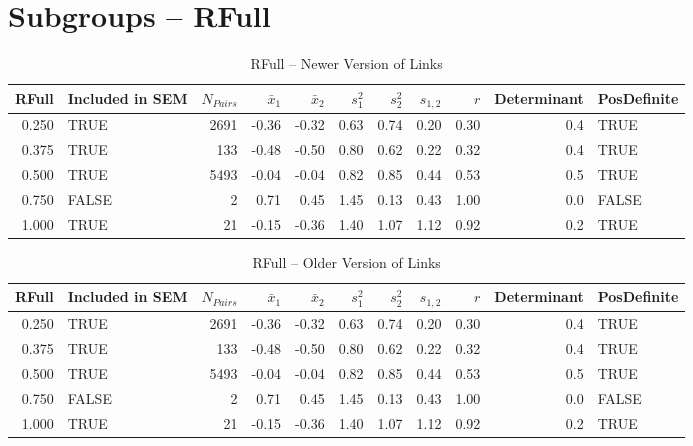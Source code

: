 \documentclass{article}\usepackage[]{graphicx}\usepackage[]{color}
\begin{document}
\section{Subgroups --  RFull }%
\begin{table}[ht]
\centering
\begin{tabular}{rlrrrrrrrrl}
  \hline
RFull & Included in SEM & $N_{Pairs}$ & $\bar{x}_1$ & $\bar{x}_2$ & $s_1^2$ & $s_2^2$ & $s_{1,2}$ & $r$ & Determinant & PosDefinite \\ 
  \hline
0.250 & TRUE & 2691 & -0.36 & -0.32 & 0.63 & 0.74 & 0.20 & 0.30 & 0.4 & TRUE \\ 
  0.375 & TRUE & 133 & -0.48 & -0.50 & 0.80 & 0.62 & 0.22 & 0.32 & 0.4 & TRUE \\ 
  0.500 & TRUE & 5493 & -0.04 & -0.04 & 0.82 & 0.85 & 0.44 & 0.53 & 0.5 & TRUE \\ 
  0.750 & FALSE & 2 & 0.71 & 0.45 & 1.45 & 0.13 & 0.43 & 1.00 & 0.0 & FALSE \\ 
  1.000 & TRUE & 21 & -0.15 & -0.36 & 1.40 & 1.07 & 1.12 & 0.92 & 0.2 & TRUE \\ 
   \hline
\end{tabular}
\caption{RFull -- Newer Version of Links} 
\end{table}
\begin{table}[ht]
\centering
\begin{tabular}{rlrrrrrrrrl}
  \hline
RFull & Included in SEM & $N_{Pairs}$ & $\bar{x}_1$ & $\bar{x}_2$ & $s_1^2$ & $s_2^2$ & $s_{1,2}$ & $r$ & Determinant & PosDefinite \\ 
  \hline
0.250 & TRUE & 2691 & -0.36 & -0.32 & 0.63 & 0.74 & 0.20 & 0.30 & 0.4 & TRUE \\ 
  0.375 & TRUE & 133 & -0.48 & -0.50 & 0.80 & 0.62 & 0.22 & 0.32 & 0.4 & TRUE \\ 
  0.500 & TRUE & 5493 & -0.04 & -0.04 & 0.82 & 0.85 & 0.44 & 0.53 & 0.5 & TRUE \\ 
  0.750 & FALSE & 2 & 0.71 & 0.45 & 1.45 & 0.13 & 0.43 & 1.00 & 0.0 & FALSE \\ 
  1.000 & TRUE & 21 & -0.15 & -0.36 & 1.40 & 1.07 & 1.12 & 0.92 & 0.2 & TRUE \\ 
   \hline
\end{tabular}
\caption{RFull -- Older Version of Links} 
\end{table}
\end{document}

